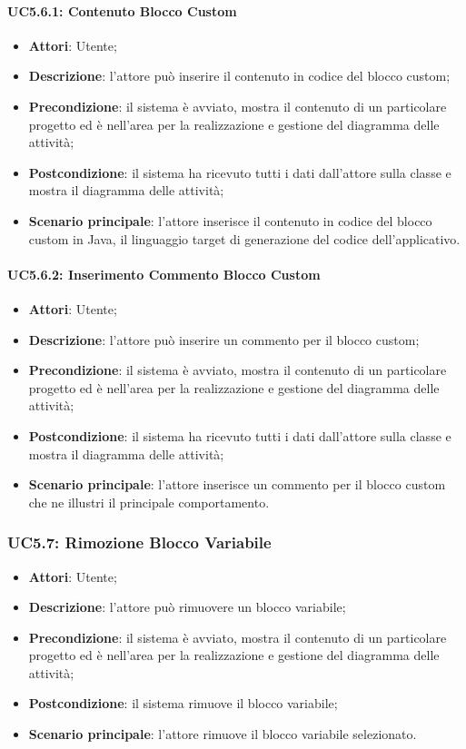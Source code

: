 \paragraph{UC5.6.1: Contenuto Blocco Custom}
\label{UC5.6.1}
\begin{itemize}
	\item \textbf{Attori}: Utente;
	\item \textbf{Descrizione}: l'attore può inserire il contenuto in codice del blocco custom;
	\item \textbf{Precondizione}: il sistema è avviato, mostra il contenuto di un particolare progetto ed è nell'area per la realizzazione e gestione del diagramma delle attività;
	\item \textbf{Postcondizione}: il sistema ha ricevuto tutti i dati dall'attore sulla classe e mostra il diagramma delle attività;
	\item \textbf{Scenario principale}: l'attore inserisce il contenuto in codice del blocco custom in Java, il linguaggio target di generazione del codice dell'applicativo.
\end{itemize}

\paragraph{UC5.6.2: Inserimento Commento Blocco Custom}
\label{UC5.6.2}
\begin{itemize}
	\item \textbf{Attori}: Utente;
	\item \textbf{Descrizione}: l'attore può inserire un commento per il blocco custom;
	\item \textbf{Precondizione}: il sistema è avviato, mostra il contenuto di un particolare progetto ed è nell'area per la realizzazione e gestione del diagramma delle attività;
	\item \textbf{Postcondizione}: il sistema ha ricevuto tutti i dati dall'attore sulla classe e mostra il diagramma delle attività;
	\item \textbf{Scenario principale}: l'attore inserisce un commento per il blocco custom che ne illustri il principale comportamento.
\end{itemize}

\subsubsection{UC5.7: Rimozione Blocco Variabile}
\label{UC5.7}
\begin{itemize}
	\item \textbf{Attori}: Utente;
	\item \textbf{Descrizione}: l'attore può rimuovere un blocco variabile;
	\item \textbf{Precondizione}: il sistema è avviato, mostra il contenuto di un particolare progetto ed è nell'area per la realizzazione e gestione del diagramma delle attività;
	\item \textbf{Postcondizione}: il sistema rimuove il blocco variabile;
	\item \textbf{Scenario principale}: l'attore rimuove il blocco variabile selezionato.
\end{itemize}

